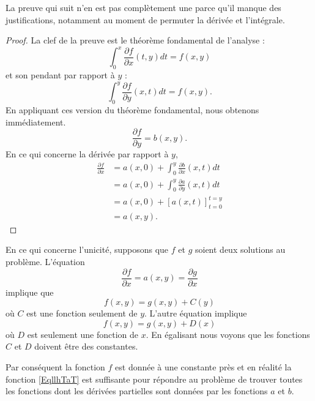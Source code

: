 La preuve qui suit n'en est pas complètement une parce qu'il manque des justifications, notamment au moment de permuter la dérivée et l'intégrale.
\begin{proof}
	La clef de la preuve est le théorème fondamental de l'analyse :
	\begin{equation}
		\int_0^x \frac{ \partial f }{ \partial x }(t,y)dt=f(x,y)
	\end{equation}
	et son pendant par rapport à \( y\) :
	\begin{equation}
		\int_0^y \frac{ \partial f }{ \partial y }(x,t)dt=f(x,y).
	\end{equation}
	En appliquant ces version du théorème fondamental, nous obtenons immédiatement.
	\begin{equation}
		\frac{ \partial f }{ \partial y }=b(x,y).
	\end{equation}
	En ce qui concerne la dérivée par rapport à \( y\),
	\begin{subequations}
		\begin{align}
			\frac{ \partial f }{ \partial x } & =a(x,0)+\int_0^y\frac{ \partial b }{ \partial x }(x,t)dt \\
			                                  & =a(x,0)+\int_0^y\frac{ \partial a }{ \partial y }(x,t)dt \\
			                                  & =a(x,0)+[a(x,t)]_{t=0}^{t=y}                             \\
			                                  & =a(x,y).
		\end{align}
	\end{subequations}
\end{proof}

En ce qui concerne l'unicité, supposons que \( f\) et \( g\) soient deux solutions au problème. L'équation
\begin{equation}
	\frac{ \partial f }{ \partial x }=a(x,y)=\frac{ \partial g }{ \partial x }
\end{equation}
implique que
\begin{equation}
	f(x,y)=g(x,y)+C(y)
\end{equation}
où \( C\) est une fonction seulement de \( y\). L'autre équation implique
\begin{equation}
	f(x,y)=g(x,y)+D(x)
\end{equation}
où \( D\) est seulement une fonction de \( x\). En égalisant nous voyons que les fonctions \( C\) et \( D\) doivent être des constantes.

Par conséquent la fonction \( f\) est donnée à une constante près et en réalité la fonction \eqref{EqllhTaT} est suffisante pour répondre au problème de trouver toutes les fonctions dont les dérivées partielles sont données par les fonctions \( a\) et \( b\).

